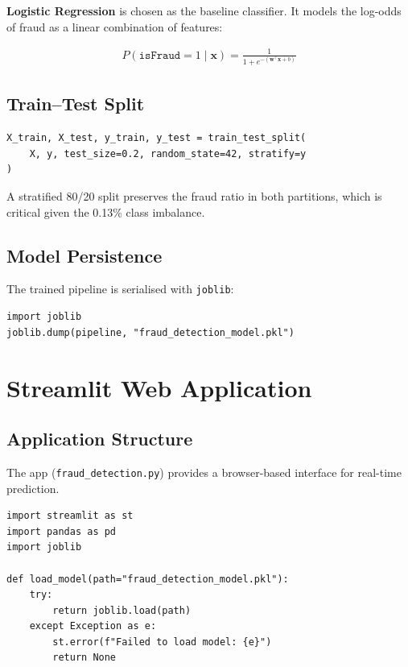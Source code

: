 \documentclass[12pt, a4paper]{article}
\begin{document}
\textbf{Logistic Regression} is chosen as the baseline classifier. It models the log-odds of fraud as a linear combination of features:

\begin{align}
P(\texttt{isFraud} = 1 \mid \mathbf{x}) = \frac{1}{1 + e^{-(\mathbf{w}^\top \mathbf{x} + b)}}
\end{align}

\subsection{Train--Test Split}

\begin{lstlisting}
X_train, X_test, y_train, y_test = train_test_split(
    X, y, test_size=0.2, random_state=42, stratify=y
)
\end{lstlisting}

A stratified 80/20 split preserves the fraud ratio in both partitions, which is critical given the 0.13\% class imbalance.

\subsection{Model Persistence}

The trained pipeline is serialised with \texttt{joblib}:

\begin{lstlisting}
import joblib
joblib.dump(pipeline, "fraud_detection_model.pkl")
\end{lstlisting}

\section{Streamlit Web Application}

\subsection{Application Structure}

The app (\texttt{fraud\_detection.py}) provides a browser-based interface for real-time prediction.

\begin{lstlisting}
import streamlit as st
import pandas as pd
import joblib

def load_model(path="fraud_detection_model.pkl"):
    try:
        return joblib.load(path)
    except Exception as e:
        st.error(f"Failed to load model: {e}")
        return None
\end{lstlisting}
\end{document}
